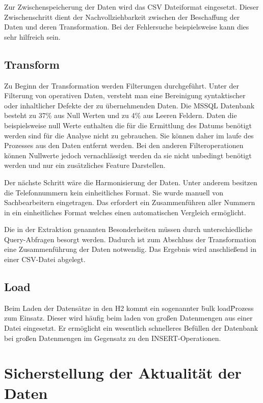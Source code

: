 Zur Zwischenspeicherung der Daten wird das CSV Dateiformat eingesetzt. Dieser Zwischenschritt dient der Nachvollziehbarkeit zwischen der Beschaffung der Daten und deren Transformation. Bei der Fehlersuche beispielsweise kann dies sehr hilfreich sein.  

\subsection{Transform}

Zu Beginn der Transformation werden Filterungen durchgeführt. Unter der Filterung von operativen Daten, versteht man eine Bereinigung syntaktischer oder inhaltlicher Defekte der zu übernehmenden Daten. Die MSSQL Datenbank besteht zu 37\% aus Null Werten und zu 4\% aus Leeren Feldern. Daten die beispielsweise null Werte enthalten die für die Ermittlung des Datums benötigt werden sind für die Analyse nicht zu gebrauchen. Sie können daher im laufe des Prozesses aus den Daten entfernt werden. Bei den anderen Filteroperationen können Nullwerte jedoch vernachlässigt werden da sie nicht unbedingt benötigt werden und nur ein zusätzliches Feature Darstellen.

Der nächste Schritt wäre die Harmonisierung der Daten. Unter anderem besitzen die Telefonnummern kein einheitliches Format. Sie wurde manuell von Sachbearbeitern eingetragen. Das erfordert ein Zusammenführen aller Nummern in ein einheitliches Format welches einen automatischen Vergleich ermöglicht.

Die in der Extraktion genannten Besonderheiten müssen durch unterschiedliche Query-Abfragen besorgt werden. Dadurch ist zum Abschluss der Transformation eine Zusammenführung der Daten notwendig. Das Ergebnis wird anschließend in einer CSV-Datei abgelegt. 

\subsection{Load}

Beim Laden der Datensätze in den H2 kommt ein sogenannter \"bulk load\" Prozess zum Einsatz. Dieser wird häufig beim laden von großen Datenmengen aus einer Datei eingesetzt. Er ermöglicht ein wesentlich schnelleres Befüllen der Datenbank bei großen Datenmengen im Gegensatz zu den INSERT-Operationen.

\section{Sicherstellung der Aktualität der Daten}

